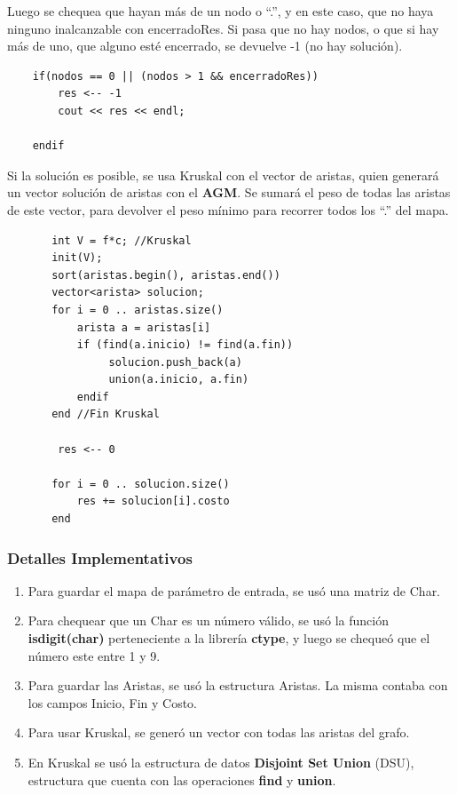    Luego se chequea que hayan más de un nodo o “.”, y en este caso, que no haya ninguno inalcanzable con encerradoRes. Si pasa que no hay nodos, o que si hay más de uno, que alguno esté encerrado, se devuelve -1 (no hay solución).

   \begin{codesnippet}
   \begin{verbatim}
    if(nodos == 0 || (nodos > 1 && encerradoRes))
    	res <-- -1
    	cout << res << endl;

    endif
   \end{verbatim}
   \end{codesnippet}

 	Si la solución es posible, se usa Kruskal con el vector de aristas, quien generará un vector solución de aristas con el \textbf{AGM}. Se sumará el peso de todas las aristas de este vector, para devolver el peso mínimo para recorrer todos los “.” del mapa.

 	\begin{codesnippet}
    \begin{verbatim}
       int V = f*c; //Kruskal
	   init(V);
	   sort(aristas.begin(), aristas.end())
       vector<arista> solucion;
       for i = 0 .. aristas.size() 
           arista a = aristas[i]
           if (find(a.inicio) != find(a.fin))
                solucion.push_back(a)
                union(a.inicio, a.fin)
           endif
       end //Fin Kruskal
    	
    	res <-- 0

       for i = 0 .. solucion.size()
           res += solucion[i].costo
       end

   \end{verbatim}
   \end{codesnippet}


	\subsubsection{Detalles Implementativos}\label{ej2_det}
		\begin{enumerate}
			\item{
				Para guardar el mapa de parámetro de entrada, se usó una matriz de Char.
			}
			\item{
				Para chequear que un Char es un número válido, se usó la función \textbf{isdigit(char)} perteneciente a la librería \textbf{ctype}, y luego se chequeó que el número este entre 1 y 9.
			}
			\item{
				Para guardar las Aristas, se usó la estructura Aristas. La misma contaba con los campos Inicio, Fin y Costo.
			}
			\item{
				Para usar Kruskal, se generó un vector con todas las aristas del grafo.
			}
			\item{
				En Kruskal se usó la estructura de datos \textbf{Disjoint Set Union} (DSU), estructura que cuenta con las operaciones \textbf{find} y \textbf{union}.
			}
		\end{enumerate}


